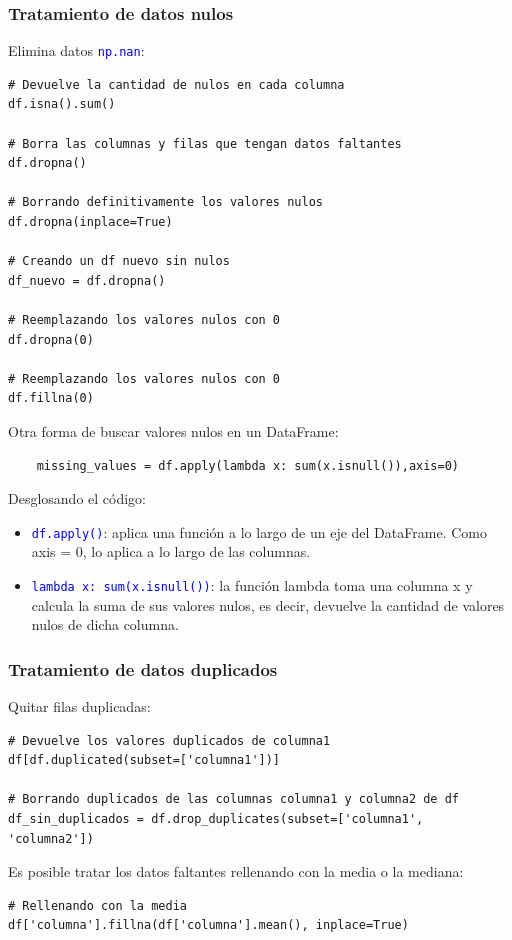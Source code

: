 \documentclass[a4paper, 12pt]{book}
\begin{document}
\subsubsection{Tratamiento de datos nulos}
Elimina datos \texttt{\textcolor{blue}{np.nan}}:
\begin{verbatim}
# Devuelve la cantidad de nulos en cada columna
df.isna().sum()	
	
# Borra las columnas y filas que tengan datos faltantes
df.dropna()
	
# Borrando definitivamente los valores nulos
df.dropna(inplace=True)
	
# Creando un df nuevo sin nulos
df_nuevo = df.dropna()
	
# Reemplazando los valores nulos con 0
df.dropna(0)
	
# Reemplazando los valores nulos con 0
df.fillna(0)
\end{verbatim}
Otra forma de buscar valores nulos en un DataFrame:
\begin{verbatim}
	missing_values = df.apply(lambda x: sum(x.isnull()),axis=0)
\end{verbatim}
Desglosando el código:

\begin{itemize}
	\item \texttt{\textcolor{blue}{df.apply()}}: aplica una función a lo largo de un eje del DataFrame. Como axis = 0, lo aplica a lo largo de las columnas.
	\item \texttt{\textcolor{blue}{lambda x: sum(x.isnull())}}: la función lambda toma una columna x y calcula la suma de sus valores nulos, es decir, devuelve la cantidad de valores nulos de dicha columna.
\end{itemize}

\subsubsection{Tratamiento de datos duplicados}
Quitar filas duplicadas:
\begin{verbatim}
# Devuelve los valores duplicados de columna1
df[df.duplicated(subset=['columna1'])]
	
# Borrando duplicados de las columnas columna1 y columna2 de df
df_sin_duplicados = df.drop_duplicates(subset=['columna1', 'columna2'])
\end{verbatim}

Es posible tratar los datos faltantes rellenando con la media o la mediana:
\begin{verbatim}
# Rellenando con la media
df['columna'].fillna(df['columna'].mean(), inplace=True)
\end{verbatim}
\end{document}

